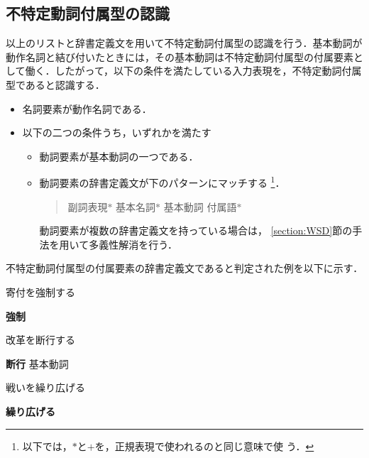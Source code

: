 \documentclass{nlp}
\begin{document}
\subsection{不特定動詞付属型の認識}
以上のリストと辞書定義文を用いて不特定動詞付属型の認識を行う．基本動詞が
動作名詞と結び付いたときには，その基本動詞は不特定動詞付属型の付属要素と
して働く．したがって，以下の条件を満たしている入力表現を，不特定動詞付属
型であると認識する．
\begin{itemize}
 \item 名詞要素が動作名詞である．
 \item 以下の二つの条件うち，いずれかを満たす
       \begin{itemize}
	\item 動詞要素が基本動詞の一つである．
	\item 動詞要素の辞書定義文が下のパターンにマッチする
	      \footnote{
	      以下では，$*$と$+$を，正規表現で使われるのと同じ意味で使
	      う．}．
	      \begin{quote}
	       副詞表現$*$ 基本名詞$*$ 基本動詞 付属語$*$
	      \end{quote}
	      動詞要素が複数の辞書定義文を持っている場合は，
	      \ref{section:WSD}節の手法を用いて多義性解消を行う．
       \end{itemize}
\end{itemize}

不特定動詞付属型の付属要素の辞書定義文であると判定された例を以下に示す．
\begin{example}
 \item 寄付を強制する
 
 {\bf 強制} \hspace{10pt}

 \item 改革を断行する
 
 {\bf 断行} \hspace{10pt}
 {基本動詞}

 \item 戦いを繰り広げる
 
 {\bf 繰り広げる} \hspace{10pt}
\end{example}
\end{document}
